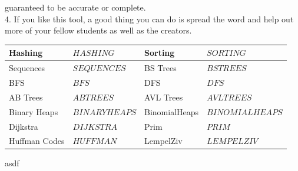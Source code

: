 \documentclass[12pt]{article}
\begin{document}
    guaranteed to be accurate or complete.
    \\[0.2in]
    4. If you like this tool, a good thing you can do is spread the word and help out more of your fellow students as well as the creators.
    \vspace{20px}
    \begin{center}
        \begin{tabular}{|P{2.5cm}|P{2.5cm}|P{2.5cm}| P{2.5cm} |}
            \hline
            Hashing & $HASHING$ & Sorting & $SORTING$ \\ \hline
            Sequences & $SEQUENCES$ & BS Trees & $BSTREES$ \\ \hline
            BFS & $BFS$ & DFS & $DFS$ \\ \hline
            AB Trees & $ABTREES$ & AVL Trees & $AVLTREES$ \\ \hline
            Binary Heaps & $BINARYHEAPS$ & BinomialHeaps & $BINOMIALHEAPS$ \\ \hline
            Dijkstra & $DIJKSTRA$ & Prim & $PRIM$ \\ \hline
            Huffman Codes & $HUFFMAN$ & LempelZiv &  $LEMPELZIV$ \\ \hline
        \end{tabular}
    \end{center}
    \newpage
    asdf
\end{document}
